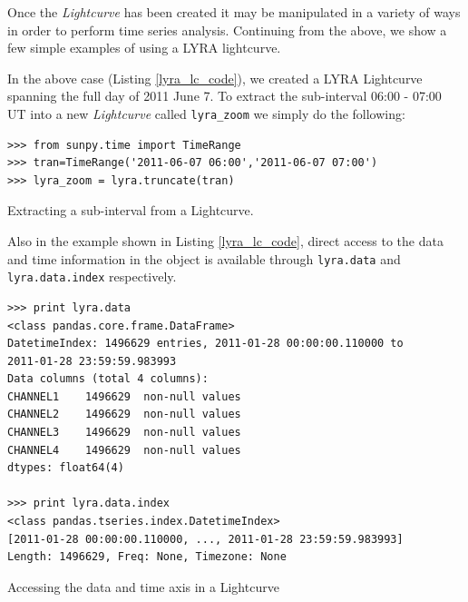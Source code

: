 Once the \textit{Lightcurve} has been created it may be manipulated in a variety of ways in order to perform time series analysis. Continuing from the above, we show a few simple examples of using a LYRA lightcurve. 

In the above case (Listing \ref{lyra_lc_code}), we created a LYRA Lightcurve spanning the full day of 2011 June 7. To extract the sub-interval 06:00 - 07:00 UT into a new \textit{Lightcurve} called \verb|lyra_zoom| we simply do the following:

\begin{listing}[H]
\begin{verbatim}
>>> from sunpy.time import TimeRange
>>> tran=TimeRange('2011-06-07 06:00','2011-06-07 07:00')
>>> lyra_zoom = lyra.truncate(tran)
\end{verbatim}
\label{lyra_truncate}
\caption{Extracting a sub-interval from a Lightcurve.}
\end{listing}

Also in the example shown in Listing \ref{lyra_lc_code}, direct access to the data and time information in the object is available through \verb|lyra.data| and \verb|lyra.data.index| respectively.

\begin{listing}[H]
\begin{verbatim}
>>> print lyra.data
<class pandas.core.frame.DataFrame>
DatetimeIndex: 1496629 entries, 2011-01-28 00:00:00.110000 to 
2011-01-28 23:59:59.983993
Data columns (total 4 columns):
CHANNEL1    1496629  non-null values
CHANNEL2    1496629  non-null values
CHANNEL3    1496629  non-null values
CHANNEL4    1496629  non-null values
dtypes: float64(4)

>>> print lyra.data.index
<class pandas.tseries.index.DatetimeIndex>
[2011-01-28 00:00:00.110000, ..., 2011-01-28 23:59:59.983993]
Length: 1496629, Freq: None, Timezone: None
\end{verbatim}
\label{lyra_pandas}
\caption{Accessing the data and time axis in a Lightcurve}
\end{listing}

